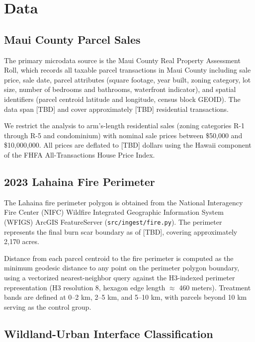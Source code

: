 \documentclass[12pt]{article}
\begin{document}
\section{Data}
\label{sec:data}

\subsection{Maui County Parcel Sales}

The primary microdata source is the Maui County Real Property Assessment Roll,
which records all taxable parcel transactions in Maui County including sale price,
sale date, parcel attributes (square footage, year built, zoning category, lot size,
number of bedrooms and bathrooms, waterfront indicator), and spatial identifiers
(parcel centroid latitude and longitude, census block GEOID). The data span [TBD]
and cover approximately [TBD] residential transactions.

We restrict the analysis to arm's-length residential sales (zoning categories
R-1 through R-5 and condominium) with nominal sale prices between \$50{,}000
and \$10{,}000{,}000. All prices are deflated to [TBD] dollars using the Hawaii
component of the FHFA All-Transactions House Price Index.

\subsection{2023 Lahaina Fire Perimeter}

The Lahaina fire perimeter polygon is obtained from the National Interagency
Fire Center (NIFC) Wildfire Integrated Geographic Information System (WFIGS)
ArcGIS FeatureServer (\texttt{src/ingest/fire.py}). The perimeter represents the
final burn scar boundary as of [TBD], covering approximately 2{,}170 acres.

Distance from each parcel centroid to the fire perimeter is computed as the
minimum geodesic distance to any point on the perimeter polygon boundary,
using a vectorized nearest-neighbor query against the H3-indexed perimeter
representation (H3 resolution 8, hexagon edge length $\approx$ 460 meters).
Treatment bands are defined at 0--2 km, 2--5 km, and 5--10 km, with parcels
beyond 10 km serving as the control group.

\subsection{Wildland-Urban Interface Classification}
\end{document}
